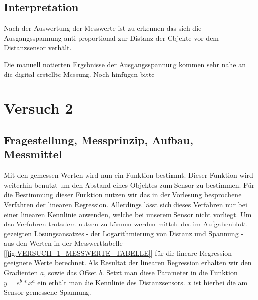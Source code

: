 \documentclass[12pt, oneside, a4paper, \docLanguage]{report}
\begin{document}
\section{Interpretation}
\label{chap:VERSUCH_1_INTERPRETATION}
Nach der Auswertung der Messwerte ist zu erkennen das sich die Ausgangsspannung anti-proportional zur Distanz der Objekte vor dem Distanzsensor verhält.

Die manuell notierten Ergebnisse der Ausgangsspannung kommen sehr nahe an die digital erstellte Messung.
Noch hinfügen bitte



%
%
\chapter{Versuch 2}
\label{chap:Modellierung der Kennlinie durch lineare Regression}

\section{Fragestellung, Messprinzip, Aufbau, Messmittel}
\label{chap:VERSUCH_2_FRAGESTELLUNG}
Mit den gemessen Werten wird nun ein Funktion bestimmt. Dieser Funktion wird weiterhin benutzt um den Abstand eines Objektes zum Sensor zu bestimmen.
Für die Bestimmung dieser Funktion nutzen wir das in der Vorlesung besprochene Verfahren der linearen Regression. 
Allerdings lässt sich dieses Verfahren nur bei einer linearen Kennlinie anwenden, welche bei unserem Sensor nicht vorliegt. Um das Verfahren trotzdem nutzen zu können werden mittels des im Aufgabenblatt gezeigten Lösungsansatzes - der Logarithmierung von Distanz und Spannung - aus den Werten in der Messwerttabelle [\ref{fig:VERSUCH_1_MESSWERTE_TABELLE}] für die lineare Regression geeignete Werte berechnet.
Als Resultat der linearen Regression erhalten wir den Gradienten \(a\), sowie das Offset \(b\). Setzt man diese Parameter in die Funktion \(y = e^b * x^a\) ein erhält man die Kennlinie des Distanzsensors. \(x\) ist hierbei die am Sensor gemessene Spannung.
   
\end{document}
